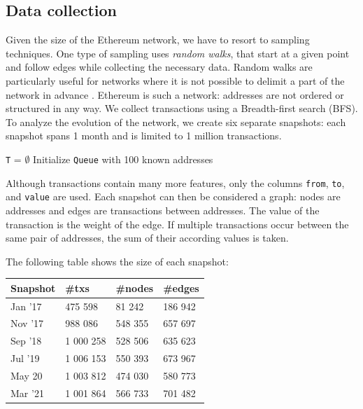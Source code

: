 \documentclass[10pt,a4paper]{article}
\begin{document}
\begin{multicols}{2}
\section{Data collection}
Given the size of the Ethereum network, we have to resort to sampling techniques. One type of sampling uses \textit{random walks}, that start at a given point and follow edges while collecting the necessary data. Random walks are particularly useful for networks where it is not possible to delimit a part of the network in advance \cite{Becchetti06acomparison}. Ethereum is such a network: addresses are not ordered or structured in any way. We collect transactions using a Breadth-first search (BFS). To analyze the evolution of the network, we create six separate snapshots: each snapshot spans 1 month and is limited to 1 million transactions.

\medskip
\begin{algorithm}[H]
\SetAlgoLined
\hspace{5pt}\texttt{T} = $\emptyset$\newline
Initialize \texttt{Queue} with 100 known addresses
\end{algorithm}

Although transactions contain many more features, only the columns \texttt{from}, \texttt{to}, and \texttt{value} are used.
Each snapshot can then be considered a graph: nodes are addresses and edges are transactions between addresses. The value of the transaction is the weight of the edge. If multiple transactions occur between the same pair of addresses, the sum of their according values is taken. 

The following table shows the size of each snapshot:\\
\vspace{5pt}
\bgroup
\def\arraystretch{1.5}
\begin{tabular}{p{}|p{}|p{}|p{}}
\textbf{Snapshot} & \textbf{\#txs} & \textbf{\#nodes} & \textbf{\#edges} \\ 
\hline 
Jan '17 & 475 598 & 81 242 & 186 942  \\
Nov '17 & 988 086 & 548 355 & 657 697  \\
Sep '18 & 1 000 258 & 528 506 & 635 623 \\
Jul '19 & 1 006 153 & 550 393 & 673 967 \\
May 20 & 1 003 812 & 474 030 & 580 773 \\
Mar '21 & 1 001 864 & 566 733 & 701 482 \\
\end{tabular}
\egroup


\end{multicols}
\end{document}
